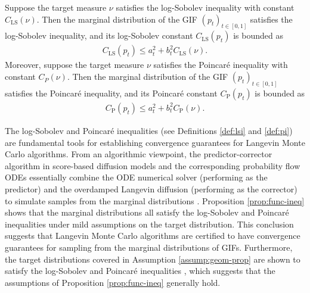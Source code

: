\documentclass[twoside,11pt]{article}
\numberwithin{equation}{section}
\begin{document}
\begin{proposition} \label{prop:func-ineq}
    Suppose the target measure $\nu$ satisfies the log-Sobolev inequality with constant $C_{\mathrm{LS}}(\nu)$. Then the marginal distribution of the
    GIF $(p_t)_{t \in [0, 1]}$ satisfies the log-Sobolev inequality, and its log-Sobolev constant $C_{\mathrm{LS}}(p_t)$ is bounded as
    \begin{align*}
        C_{\mathrm{LS}}(p_t) \le a_t^2 + b_t^2 C_{\mathrm{LS}}(\nu).
    \end{align*}
    Moreover, suppose the target measure $\nu$ satisfies the Poincar{\'e} inequality with constant $C_{P}(\nu)$. Then the marginal distribution of the GIF $(p_t)_{t \in [0, 1]}$ satisfies the Poincar{\'e} inequality, and its Poincar{\'e} constant $C_{\mathrm{P}}(p_t)$ is bounded as
    \begin{align*}
        C_{\mathrm{P}}(p_t) \le a_t^2 + b_t^2 C_{\mathrm{P}}(\nu).
    \end{align*}
\end{proposition}




    The log-Sobolev and Poincar{\'e} inequalities (see Definitions \ref{def:lsi} and \ref{def:pi}) are fundamental tools
    for establishing convergence guarantees for Langevin Monte Carlo algorithms. From an algorithmic viewpoint, the predictor-corrector algorithm in score-based diffusion models and the corresponding probability flow ODEs essentially combine the ODE numerical solver (performing as the predictor) and the overdamped Langevin diffusion (performing as the corrector) to simulate samples from the marginal distributions \citep{song2021scorebased}. Proposition \ref{prop:func-ineq} shows that the marginal distributions all satisfy the log-Sobolev and Poincar{\'e} inequalities under mild assumptions on the target distribution. This conclusion suggests that Langevin Monte Carlo algorithms are certified to have convergence guarantees for sampling from the marginal distributions of
     GIFs. Furthermore, the target distributions covered in Assumption \ref{assump:geom-prop} are
      shown to satisfy the log-Sobolev and Poincar{\'e} inequalities \citep{mikulincer2021brownian, dai2023lipschitz, fathi2023transportation}, which %
      suggests that the assumptions of Proposition \ref{prop:func-ineq} generally hold.
\end{document}
